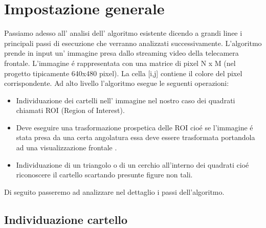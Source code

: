 \section{Impostazione generale}

	Passiamo adesso all' analisi dell' algoritmo esistente dicendo a grandi linee i principali passi di esecuzione che verranno analizzati successivamente. 
	L'algoritmo prende in input un' immagine presa dallo streaming video della telecamera frontale. L'immagine \'e rappresentata con una matrice di pixel N x M (nel progetto tipicamente 640x480 pixel). La cella [i,j] contiene il colore del pixel corrispondente. 
	Ad alto livello l'algoritmo esegue le seguenti operazioni:
	\begin{itemize}
		\item Individuazione dei cartelli nell' immagine nel nostro caso dei quadrati chiamati ROI (Region of Interest).
		\item Deve eseguire una trasformazione prospetica delle ROI cio\'e se l'immagine \'e stata presa da una certa angolatura essa deve essere trasformata portandola ad una visualizzazione frontale .
		\item Individuazione di un triangolo o di un cerchio all'interno dei quadrati cio\'e riconoscere il cartello scartando presunte figure non tali.
	\end{itemize}
	Di seguito passeremo ad analizzare nel dettaglio i passi dell'algoritmo.

\subsection{Individuazione cartello}

